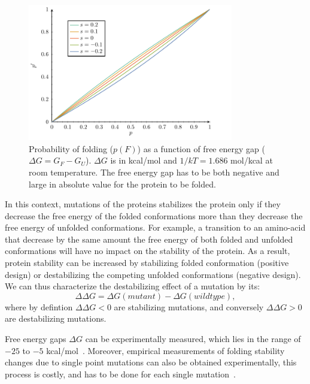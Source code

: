 \begin{figure}[H]
    \centering
    \includegraphics[width=0.8\textwidth, page=5] {figures.pdf}
    \caption[Probability of folding]{
    Probability of folding ($p(F)$) as a function of free energy gap ($\Delta G = G_F - G_U$).
    $\Delta G$ is in kcal/mol and $1/kT=1.686$ mol/kcal at room temperature.
    The free energy gap has to be both negative and large in absolute value for the protein to be folded.
    }
	\label{fig:intro-proba-folding}
\end{figure}

In this context, mutations of the proteins stabilizes the protein only if they decrease the free energy of the folded conformations more than they decrease the free energy of unfolded conformations.
For example, a {transition} to an amino-acid that decrease by the same amount the free energy of both folded and unfolded conformations will have no impact on the stability of the protein.
As a result, protein stability can be increased by stabilizing folded conformation (positive design) or destabilizing the competing unfolded conformations (negative design).
We can thus characterize the destabilizing effect of a mutation by its:
\begin{equation}
    \Delta \Delta G = \Delta G(mutant) - \Delta G(wild type),
\end{equation}
where by defintion $\Delta \Delta G <0 $ are stabilizing mutations, and conversely $\Delta \Delta G > 0 $ are destabilizing mutations.

Free energy gaps $\Delta G$ can be experimentally measured, which lies in the range of $-25$ to $-5$ kcal/mol~\citep{Kumar2006, Gromiha2016}.
Moreover, empirical measurements of folding stability changes due to single point mutations can also be obtained experimentally, this process is costly, and has to be done for each single mutation~\citep{Rocklin2017}.

